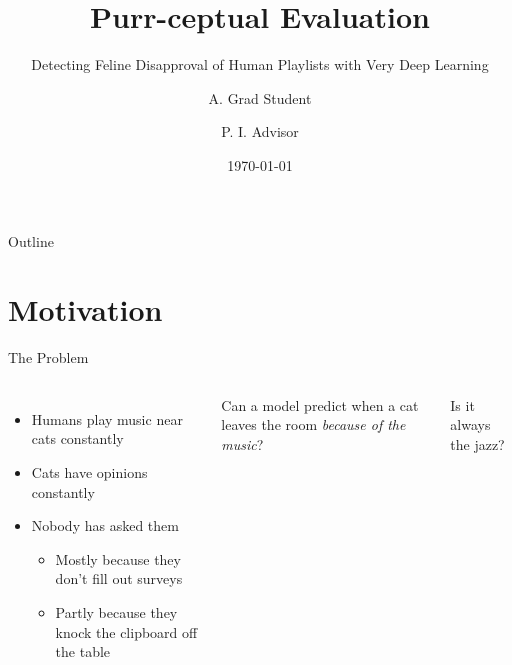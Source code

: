 \documentclass[10pt,aspectratio=169,xcolor=table]{beamer}
\title{Purr-ceptual Evaluation}
\subtitle{Detecting Feline Disapproval of Human Playlists with Very Deep Learning}
\author{A. Grad Student \and P. I. Advisor}
\institute{Soundbendor Lab \textperiodcentered\ Oregon State University}
\date{\today}
\begin{document}
\maketitle

\begin{frame}{Outline}
  \tableofcontents
\end{frame}

\section{Motivation}

\begin{frame}{The Problem}
  \begin{columns}[T]
      \begin{itemize}
        \item Humans play music near cats \alert{constantly}
        \item Cats have opinions \alert{constantly}
        \item Nobody has asked them
          \begin{itemize}
            \item Mostly because they don't fill out surveys
            \item Partly because they knock the clipboard off the table
          \end{itemize}
      \end{itemize}
      \medskip
      \begin{rq}
        Can a model predict when a cat leaves the room \emph{because of the music}?
      \end{rq}
      \begin{rq}
        Is it always the jazz?
      \end{rq}
  \end{columns}
\end{frame}
\end{document}

